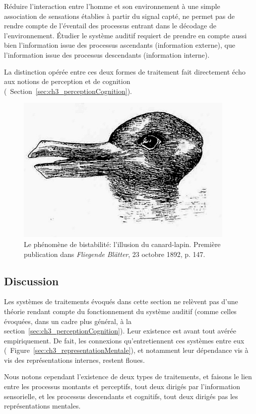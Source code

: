 Réduire l'interaction entre l'homme et son environnement à une simple association de sensations établies à partir du signal capté, ne permet pas de rendre compte de l'éventail des processus entrant dans le décodage de l'environnement. Étudier le système auditif requiert de prendre en compte aussi bien l'information issue des processus ascendants (information externe), que l'information issue des processus descendants (information interne).

La distinction opérée entre ces deux formes de traitement fait directement écho aux notions de perception et de cognition (\cf~Section~\ref{sec:ch3_perceptionCognition}).

\begin{figure}[t]
        \myfloatalign
        \includegraphics[width=.6\linewidth]{gfx/ch_3/canard_lapin}
        \caption[Le phénomène de bistabilité: l'illusion du canard-lapin.]{Le phénomène de bistabilité: l'illusion du canard-lapin. Première publication dans \emph{Fliegende Blätter}, 23 octobre 1892, p. 147.}\label{fig:bistabilite}
\end{figure}

\subsection{Discussion}

Les systèmes de traitements évoqués dans cette section ne relèvent pas d'une théorie rendant compte du fonctionnement du système auditif (comme celles évoquées, dans un cadre plus général, à la section~\ref{sec:ch3_perceptionCognition}). Leur existence est avant tout avérée empiriquement. De fait, les connexions qu'entretiennent ces systèmes entre eux (\cf~Figure~\ref{sec:ch3_representationMentale}), et notamment leur dépendance vis à vis des représentations internes, restent floues.

Nous notons cependant l'existence de deux types de traitements, et faisons le lien entre les processus montants et perceptifs, tout deux dirigés par l'information sensorielle, et les processus descendants et cognitifs, tout deux dirigés pas les représentations mentales.


